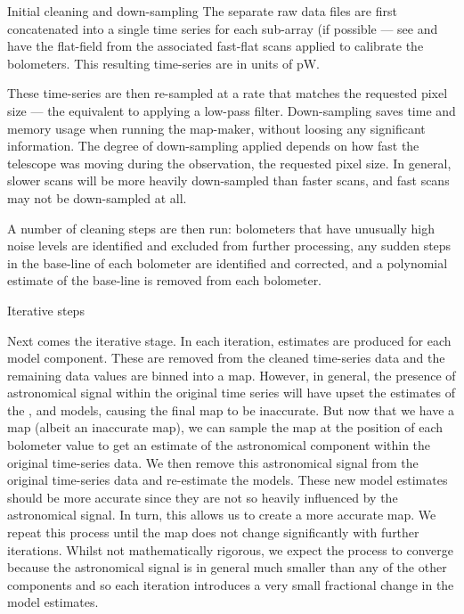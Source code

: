 \begin{enumdesc}
\item[Initial cleaning and down-sampling]
  The separate raw data files are first concatenated into a single time
  series for each sub-array (if possible --- see  and have the flat-field from the associated
  fast-flat scans applied to calibrate the bolometers.  This resulting
  time-series are in units of pW.

  These time-series are then re-sampled at a rate that matches the
  requested pixel size --- the equivalent to applying a low-pass filter.
  Down-sampling saves time and memory usage when running the map-maker,
  without loosing any significant information. The degree of
  down-sampling applied depends on how fast the telescope was moving
  during the observation, the requested pixel size. In general, slower
  scans will be more heavily down-sampled than faster scans, and fast
  scans may not be down-sampled at all.

  A number of cleaning steps are then run: bolometers that have unusually
  high noise levels are identified and excluded from further processing,
  any sudden steps in the base-line of each bolometer are identified and
  corrected, and a polynomial estimate of the base-line is removed from
  each bolometer.

\item[Iterative steps]

  Next comes the iterative stage. In each iteration, estimates are
  produced for each model component. These are removed from the cleaned
  time-series data and the remaining data values are binned into a map.
  However, in general, the presence of astronomical signal within the
  original time series will have upset the estimates of the ,
   and  models, causing the final map to be
  inaccurate. But now that we have a map (albeit an inaccurate map), we
  can sample the map at the position of each bolometer value to get an
  estimate of the astronomical component within the original time-series
  data. We then remove this astronomical signal from the original
  time-series data and re-estimate the models. These new model estimates
  should be more accurate since they are not so heavily
  influenced by the astronomical signal. In turn, this allows us to
  create a more accurate map.  We repeat this process until the map does
  not change significantly with further iterations. Whilst not
  mathematically rigorous, we expect the process to converge because the
  astronomical signal is in general much smaller than any of the other
  components and so each iteration introduces a very small fractional
  change in the model estimates.


\end{enumdesc}
